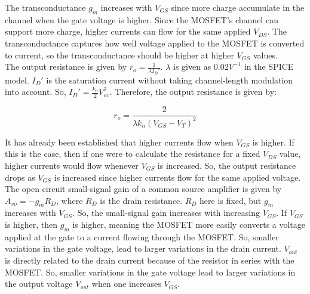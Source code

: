 \FloatBarrier

\begin{table}[h!]
	\centering
	\caption{}
	\label{tab:ss_gm}
\end{table}

\FloatBarrier

The transconductance $g_m$ increases with $V_{GS}$ since more charge accumulate in the channel when the gate voltage is higher. Since the MOSFET's channel can support more charge, higher currents can flow for the same applied $V_{DS}$. The transconductance captures how well voltage applied to the MOSFET is converted to current, so the transconductance should be higher at higher $V_{GS}$ values. \\

The output resistance is given by $r_o = \frac{1}{\lambda I_D'}$. $\lambda$ is given as $0.02 V^{-1}$ in the SPICE model. $I_D'$ is the saturation current without taking channel-length modulation into account. So, $I_D' = \frac{k_n}{2} V_{ov}^2$. Therefore, the output resistance is given by:

\begin{equation}
	\label{eq:output_r}
	r_o = \frac{2}{\lambda k_n ( V_{GS} - V_T )^2}
\end{equation}

\FloatBarrier

\begin{table}[h!]
	\centering
	\caption{}
	\label{tab:ss_ro}
\end{table}

\FloatBarrier

It has already been established that higher currents flow when $V_{GS}$ is higher. If this is the case, then if one were to calculate the resistance for a fixed $V_{DS}$ value, higher currents would flow whenever $V_{GS}$ is increased. So, the output resistance drops as $V_{GS}$ is increased since higher currents flow for the same applied voltage. \\

The open circuit small-signal gain of a common source amplifier is given by $A_{vo} = -g_m R_D$, where $R_D$ is the drain resistance. $R_D$ here is fixed, but $g_m$ increases with $V_{GS}$. So, the small-signal gain increases with increasing $V_{GS}$. If $V_{GS}$ is higher, then $g_m$ is higher, meaning the MOSFET more easily converts a voltage applied at the gate to a current flowing through the MOSFET. So, smaller variations in the gate voltage, lead to larger variations in the drain current. $V_{out}$ is directly related to the drain current because of the resistor in series with the MOSFET. So, smaller variations in the gate voltage lead to larger variations in the output voltage $V_{out}$ when one increases $V_{GS}$.

